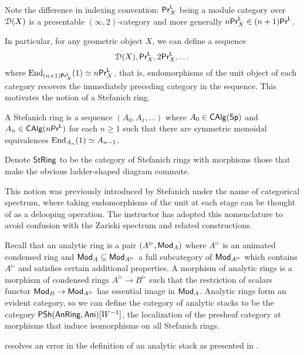 \begin{remark}
    Note the difference in indexing convention: $\mathsf{Pr}^{\mathsf{L}}_{X}$ being a module category over $\EuScript{D}(X)$ is a presentable $(\infty,2)$-category and more generally $n\mathsf{Pr}^{\mathsf{L}}_{X}\in(n+1)\mathsf{Pr}^{\mathsf{L}}$. 
\end{remark}
In particular, for any geometric object $X$, we can define a sequence $$\EuScript{D}(X), \mathsf{Pr}^{\mathsf{L}}_{X},2\mathsf{Pr}^{\mathsf{L}}_{X},\dots$$ where $\mathrm{End}_{(n+1)\mathsf{Pr}^{\mathsf{L}}_{X}}(1)\simeq n\mathsf{Pr}^{\mathsf{L}}_{X}$, that is, endomorphisms of the unit object of each category recovers the immediately preceding category in the sequence. This motivates the notion of a Stefanich ring. 
\begin{definition}\label{def: Stefanich ring}
    A Stefanich ring is a sequence $(A_{0},A_{1},\dots)$ where $A_{0}\in\mathsf{CAlg}(\mathsf{Sp})$ and $A_{n}\in\mathsf{CAlg}(n\mathsf{Pr}^{\mathsf{L}})$ for each $n\geq 1$ such that there are symmetric monoidal equivalences $\mathrm{End}_{A_{n}}(1)\simeq A_{n-1}$. 
\end{definition}
Denote $\mathsf{St}\mathsf{Ring}$ to be the category of Stefanich rings with morphisms those that make the obvious ladder-shaped diagram commute. 
\begin{remark}
    This notion was previously introduced by Stefanich under the name of categorical spectrum, where taking endomorphisms of the unit at each stage can be thought of as a delooping operation. The instructor has adopted this nomenclature to avoid confusion with the Zariski spectrum and related constructions. 
\end{remark}
\begin{example}\label{ex: analytic stacks}
    Recall that an analytic ring is a pair $(A^{\rhd},\mathsf{Mod}_{A})$ where $A^{\rhd}$ is an animated condensed ring and $\mathsf{Mod}_{A}\subseteq\mathsf{Mod}_{A^{\rhd}}$ a full subcategory of $\mathsf{Mod}_{A^{\rhd}}$ which contains $A^{\rhd}$ and satisfies certain additional properties. A morphism of analytic rings is a morphism of condensed rings $A^{\rhd}\to B^{\rhd}$ such that the restriction of scalars functor $\mathsf{Mod}_{B}\to\mathsf{Mod}_{A^{\rhd}}$ has essential image in $\mathsf{Mod}_{A}$. Analytic rings form an evident category, so we can define the category of analytic stacks to be the category $\mathsf{PSh}(\mathsf{AnRing},\mathsf{Ani})[W^{-1}]$, the localization of the presheaf category at morphisms that induce isomorphisms on all Stefanich rings. 
\end{example}
\begin{remark}\label{rmk: analytic stacks}
     resolves an error in the definition of an analytic stack as presented in \cite{AnalyticStacks}. 
\end{remark}


